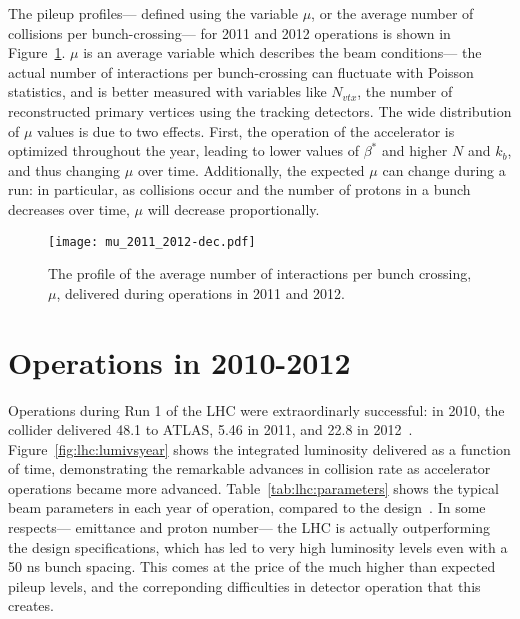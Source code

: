 The pileup profiles--- defined using the variable $\mu$, or the average number of collisions per bunch-crossing--- for 2011 and 2012 operations is shown in Figure~\ref{fig:lhc:mu-profile}. $\mu$ is an average variable which describes the beam conditions--- the actual number of interactions per bunch-crossing can fluctuate with Poisson statistics, and is better measured with variables like $N_{vtx}$, the number of reconstructed primary vertices using the tracking detectors. The wide distribution of $\mu$ values is due to two effects. First, the operation of the accelerator is optimized throughout the year, leading to lower values of $\beta^*$ and higher $N$ and $k_b$, and thus changing $\mu$ over time. Additionally, the expected $\mu$ can change during a run: in particular, as collisions occur and the number of protons in a bunch decreases over time, $\mu$ will decrease proportionally.


\begin{figure}
\centering
\texttt{[image: mu\_2011\_2012-dec.pdf]}
\label{fig:lhc:mu-profile}
\caption{The profile of the average number of interactions per bunch crossing, $\mu$, delivered during operations in 2011 and 2012.}
\end{figure}



\section{Operations in 2010-2012}

Operations during Run 1 of the LHC were extraordinarly successful: in 2010, the collider delivered 48.1 \ipb to ATLAS, 5.46 \ifb in 2011, and 22.8 \ifb in 2012~\cite{LHC2008-2013}. Figure~\ref{fig:lhc:lumivsyear} shows the integrated luminosity delivered as a function of time, demonstrating the remarkable advances in collision rate as accelerator operations became more advanced. Table~\ref{tab:lhc:parameters} shows the typical beam parameters in each year of operation, compared to the design~\cite{LHC2008-2013}. In some respects--- emittance and proton number--- the LHC is actually outperforming the design specifications, which has led to very high luminosity levels even with a 50 ns bunch spacing. This comes at the price of the much higher than expected pileup levels, and the correponding difficulties in detector operation that this creates.


